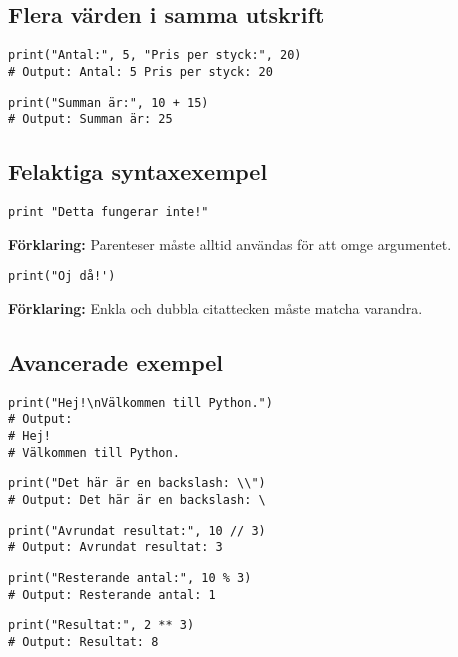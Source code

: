 \subsection*{Flera värden i samma utskrift}

\begin{lstlisting}[title=Exempel 10: Skriva ut flera saker med komma]
print("Antal:", 5, "Pris per styck:", 20)
# Output: Antal: 5 Pris per styck: 20
\end{lstlisting}

\begin{lstlisting}[title=Exempel 11: Beräkningar och text tillsammans]
print("Summan är:", 10 + 15)
# Output: Summan är: 25
\end{lstlisting}

\subsection*{Felaktiga syntaxexempel}

\begin{lstlisting}[title=Exempel 12: Saknar parantes]
print "Detta fungerar inte!"
\end{lstlisting}
\textbf{Förklaring:} Parenteser måste alltid användas för att omge argumentet.

\begin{lstlisting}[title=Exempel 13: Omatchade citattecken]
print("Oj då!')
\end{lstlisting}
\textbf{Förklaring:} Enkla och dubbla citattecken måste matcha varandra.

\subsection*{Avancerade exempel}

\begin{lstlisting}[title=Exempel 14: Skriva ut flera rader]
print("Hej!\nVälkommen till Python.")
# Output:
# Hej!
# Välkommen till Python.
\end{lstlisting}

\begin{lstlisting}[title=Exempel 15: Specialtecken i text]
print("Det här är en backslash: \\")
# Output: Det här är en backslash: \
\end{lstlisting}

\begin{lstlisting}[title=Exempel 16: Matematiskt avrundat resultat]
print("Avrundat resultat:", 10 // 3)
# Output: Avrundat resultat: 3
\end{lstlisting}

\begin{lstlisting}[title=Exempel 17: Resten av division]
print("Resterande antal:", 10 % 3)
# Output: Resterande antal: 1
\end{lstlisting}

\begin{lstlisting}[title=Exempel 18: Användning av exponent]
print("Resultat:", 2 ** 3)
# Output: Resultat: 8
\end{lstlisting}

